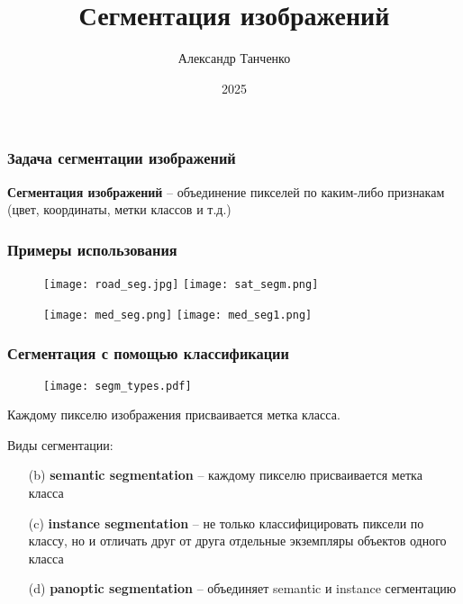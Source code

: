 \documentclass[12pt, usepdftitle=false, aspectratio=1610]{beamer}
\title[Лекция 6]{Сегментация изображений}
\author{Александр Танченко}
\institute{}
\date{2025}
\begin{document}
\begin{frame}
    \titlepage
\end{frame}

\begin{frame}
    \frametitle{Задача сегментации изображений}
    \begin{figure}
        \captionsetup[subfigure]{labelformat=empty}
        \centering
        \qquad
    \end{figure}
    \begin{figure}
        \captionsetup[subfigure]{labelformat=empty}
        \centering
        \qquad
    \end{figure}
    \textbf{Сегментация изображений} -- объединение пикселей по каким-либо признакам (цвет, координаты, метки классов и т.д.)
\end{frame}

\begin{frame}
\frametitle{Примеры использования}
\begin{figure}
    \centering
    \texttt{[image: road\_seg.jpg]}
    \texttt{[image: sat\_segm.png]}
\end{figure}
\begin{figure}
    \centering
    \texttt{[image: med\_seg.png]}
    \texttt{[image: med\_seg1.png]}
\end{figure}
\end{frame}

\begin{frame}
\frametitle{Сегментация с помощью классификации}
\begin{figure}
    \centering
    \texttt{[image: segm\_types.pdf]}
\end{figure}
Каждому пикселю изображения присваивается метка класса.
\vspace{0.2cm}

Виды сегментации:
\vspace{0.2cm}
\begin{itemize}
    \item[(b)] \textbf{semantic segmentation} -- каждому пикселю присваивается метка класса
    \item[(c)] \textbf{instance segmentation} -- не только классифицировать пиксели по классу, но и отличать друг от друга отдельные экземпляры объектов одного класса
    \item[(d)] \textbf{panoptic segmentation} -- объединяет semantic и instance сегментацию
\end{itemize}
\end{frame}
\end{document}
